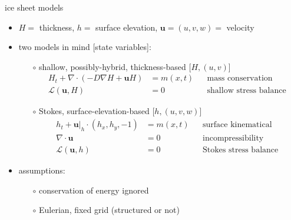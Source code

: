\documentclass[hide notes,intlimits]{beamer}
\newcommand{\Div}{\nabla\cdot}
\newcommand{\grad}{\nabla}
\begin{document}
\begin{frame}{ice sheet models}

\begin{itemize}
\item $H=$ thickness, $h=$ surface elevation, $\mathbf{u}=(u,v,w)=$ velocity
\item two models in mind [state variables]:
    \begin{itemize}
    \item[$\circ$] shallow, possibly-hybrid, thickness-based \hfill [$H,(u,v)$]
        \begin{align*}
        H_t + \Div (-D \grad H + \mathbf{u} H) &= m(x,t) && \text{mass conservation} \\
        \mathcal{L}(\mathbf{u},H) &= 0      && \text{shallow stress balance}
        \end{align*}
    \item[$\circ$] Stokes, surface-elevation-based \hfill [$h,(u,v,w)$]
        \begin{align*}
        h_t + \mathbf{u}\big|_h \cdot (h_x,h_y,-1) &= m(x,t) && \text{surface kinematical} \\
        \Div \mathbf{u} &= 0            && \text{incompressibility} \\
        \mathcal{L}(\mathbf{u},h) &= 0  && \text{Stokes stress balance}
        \end{align*}
    \end{itemize}
\item assumptions:
    \begin{itemize}
    \item[$\circ$] conservation of energy ignored
    \item[$\circ$] Eulerian, fixed grid (structured or not)
    \end{itemize}
\end{itemize}
\end{frame}
\end{document}
